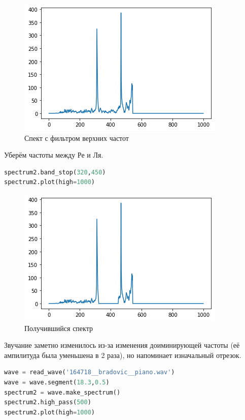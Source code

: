 \begin{figure}[H]
	\begin{center}
		\includegraphics[scale=1]{fig/lab01/lab01_23_0.png}
		\caption{Спект с фильтром верхних частот}
	\end{center}
\end{figure}

Уберём частоты между Ре и Ля.

\begin{lstlisting}[language=Python]
spectrum2.band_stop(320,450)
spectrum2.plot(high=1000)
\end{lstlisting}



\begin{figure}[H]
	\begin{center}
		\includegraphics[scale=1]{fig/lab01/lab01_25_0.png}
		\caption{Получившийся спектр}
	\end{center}
\end{figure}

Звучание заметно изменилось из-за изменения доиминирующей частоты (её ампилитуда была уменьшена в 2 раза), но напоминает изначальный отрезок.

\begin{lstlisting}[language=Python]
wave = read_wave('164718__bradovic__piano.wav')
wave = wave.segment(18.3,0.5)
spectrum2 = wave.make_spectrum()
spectrum2.high_pass(500)
spectrum2.plot(high=1000)
\end{lstlisting}

